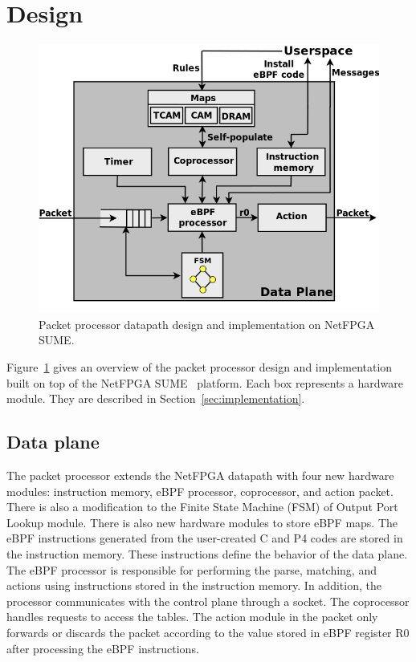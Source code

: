 \section{\system Design}
\label{sec:design}

\begin{figure}[t]
\centering
\includegraphics[width=1.\linewidth]{figures/06_fig01.png}
\caption{Packet processor datapath design and implementation on NetFPGA SUME.}
\label{fig:06_fig01}
\end{figure}

Figure~\ref{fig:06_fig01} gives an overview of the packet processor design and implementation built on top of the NetFPGA SUME~\cite{SUME2014} platform. 
Each box represents a hardware module.
They are described in Section~\ref{sec:implementation}.


\subsection{Data plane}

The packet processor extends the NetFPGA datapath with four new hardware modules: instruction memory, eBPF processor, coprocessor, and action packet. There is also a modification to the Finite State Machine (FSM) of Output Port Lookup module.
There is also new hardware modules to store eBPF maps.
The eBPF instructions generated from the user-created C and P4 codes are stored in the instruction memory. These instructions define the behavior of the data plane. The eBPF processor is responsible for performing the parse, matching, and actions using instructions stored in the instruction memory. In addition, the processor communicates with the control plane through a socket. The coprocessor handles requests to access the tables. The action module in the packet only forwards or discards the packet according to the value stored in eBPF register R0 after processing the eBPF instructions. %

